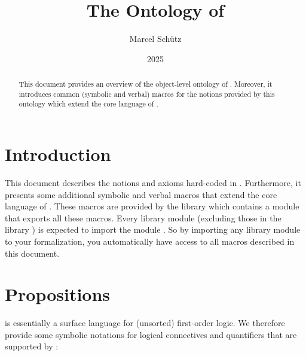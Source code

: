 \documentclass{stex}
\title{The Ontology of \Naproche}
\author{Marcel Schütz}
\date{2025}
\begin{document}

\maketitle

\begin{abstract}
  This document provides an overview of the object-level ontology of \Naproche.
  Moreover, it introduces common (symbolic and verbal) macros for the notions
  provided by this ontology which extend the core language of \ForTheL.
\end{abstract}

\ifstexhtml\else\tableofcontents\fi


\section{Introduction}\label{sec:introduction}

This document describes the notions and axioms hard-coded in \Naproche.
Furthermore, it presents some additional symbolic and verbal macros that extend
the core language of \ForTheL.
These macros are provided by the library  which contains a
module  that exports all these macros.
Every library module (excluding those in the library ) is expected to
import the module .
So by importing any library module to your formalization, you automatically have
access to all macros described in this document.


\section{Propositions}\label{sec:propositions}

\ForTheL is essentially a surface language for (unsorted) first-order logic.
We therefore provide some symbolic notations for logical connectives and
quantifiers that are supported by \ForTheL:

\end{document}
